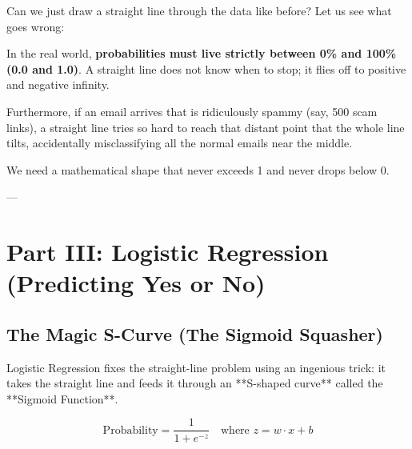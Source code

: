 \documentclass[11pt,journal,onecolumn]{IEEEtran}
\begin{document}
Can we just draw a straight line through the data like before? Let us see what goes wrong:

\begin{figure}[htbp]
\centering
{}
\end{figure}

In the real world, \textbf{probabilities must live strictly between 0\% and 100\% (0.0 and 1.0)}. A straight line does not know when to stop; it flies off to positive and negative infinity.

Furthermore, if an email arrives that is ridiculously spammy (say, 500 scam links), a straight line tries so hard to reach that distant point that the whole line tilts, accidentally misclassifying all the normal emails near the middle.

We need a mathematical shape that never exceeds 1 and never drops below 0.

---

\section{Part III: Logistic Regression (Predicting Yes or No)}

\subsection{The Magic S-Curve (The Sigmoid Squasher)}
Logistic Regression fixes the straight-line problem using an ingenious trick: it takes the straight line and feeds it through an **S-shaped curve** called the **Sigmoid Function**.

\begin{equation}
\text{Probability} = \frac{1}{1 + e^{-z}} \quad \text{where } z = w \cdot x + b
\end{equation}
\end{document}
